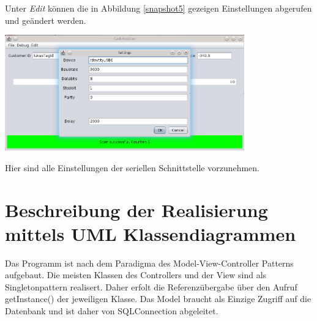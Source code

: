 \documentclass[11pt]{article} %
\begin{document}
\newline
Unter \textit{Edit} können die in Abbildung \ref{snapshot5} gezeigen
Einstellungen abgerufen und geändert werden.
\begin{center}
\includegraphics[height=5cm,keepaspectratio]{snapshot5.png}
\label{snapshot5}
\end{center}
Hier sind alle Einstellungen der seriellen Schnittstelle vorzunehmen.
~\newline
\section{Beschreibung der Realisierung mittels UML Klassendiagrammen}
Das Programm ist nach dem Paradigma des Model-View-Controller Patterns aufgebaut. Die meisten Klassen des Controllers und der View sind als Singletonpattern realisert. Daher erfolt die Referenzübergabe über den Aufruf getInstance() der jeweiligen Klasse. Das Model braucht als Einzige Zugriff auf die Datenbank und ist daher von SQLConnection abgeleitet.
\end{document}
